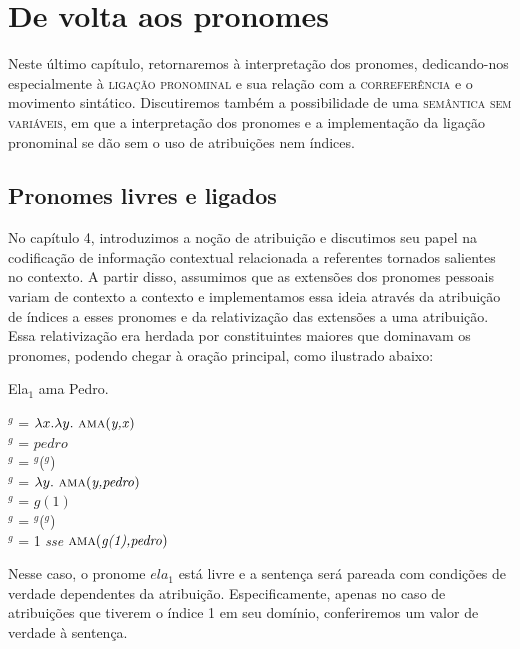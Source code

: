 
\chapter{De volta aos pronomes}

Neste último capítulo, retornaremos à interpretação dos pronomes, dedicando-nos especialmente à \textsc{ligação pronominal} e sua relação com a \textsc{correferência} e o movimento sintático. Discutiremos também a possibilidade de uma \textsc{semântica sem variáveis}, em que a interpretação dos pronomes e a implementação da ligação pronominal se dão sem o uso de atribuições nem índices. 

\section{Pronomes livres e ligados}

No capítulo 4, introduzimos a noção de atribuição e discutimos seu papel na codificação de informação contextual relacionada a referentes tornados salientes no contexto. A partir disso, assumimos que as extensões dos pronomes pessoais variam de contexto a contexto e implementamos essa ideia através da atribuição de índices a esses pronomes e da relativização das extensões a uma atribuição. Essa relativização era herdada por constituintes maiores que dominavam os pronomes, podendo chegar à oração principal, como ilustrado abaixo:

\begin{exe}
	\ex Ela$_{1}$ ama Pedro.
\end{exe}

\begin{exe}
	\ex {}$^{g}$ = $\lambda x.\lambda y.\ \predica{ama}{y,x}$ \\
	$^{g}$ = $pedro$ \\
	$^{g}$ = $^{g}$($^{g}$) \\
	$^{g}$ = $\lambda y.\ \predica{ama}{y,pedro}$ \\
	$^{g}$ = $g(1)$ \\
	$^{g}$ = $^{g}$($^{g}$) \\
	$^{g}$ = 1 \textit{sse} $\text{\textsc{ama}(\textit{g(1),pedro})}$
\end{exe}

\n Nesse caso, o pronome $ela_{1}$ está livre e a sentença será pareada com condições de verdade dependentes da atribuição. Especificamente, apenas no caso de atribuições que tiverem o índice 1 em seu domínio, conferiremos um valor de verdade à sentença.

